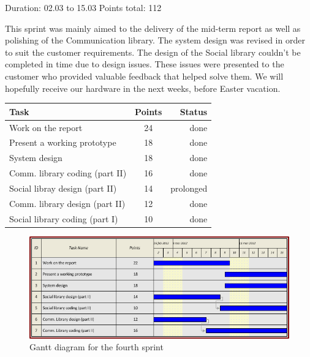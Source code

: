 Duration: 02.03 to 15.03
Points total: 112

This sprint was mainly aimed to the delivery of the mid-term report as well
as polishing of the Communication library. The system design was revised in
order to suit the customer requirements. The design of the Social library couldn't
be completed in time due to design issues. These issues were presented to the
customer who provided valuable feedback that helped solve them.
We will hopefully receive our hardware in the next weeks, before Easter vacation.

\begin{table}[ht!]
\begin{tabular}{ | l | c | r | }

\hline
\textbf{Task} & \textbf{Points} & \textbf{Status} \\
\hline

Work on the report			& 24 & done \\
\hline
Present a working prototype		& 18 & done \\
\hline
System design				& 18 & done \\
\hline
Comm. library coding (part II)      & 16 & done \\
\hline
Social libray design (part II)		& 14 & prolonged \\
\hline
Comm. library design (part II)      & 12 & done \\
\hline
Social library coding (part I)		& 10 & done \\
\hline



\end{tabular}
\end{table}

\begin{figure}[h!]
\centering \includegraphics[scale=0.8]{img/sprints-gantt4.png}
\caption{Gantt diagram for the fourth sprint}
\label{fig:sprints-gantt4}
\end{figure}

\newpage

